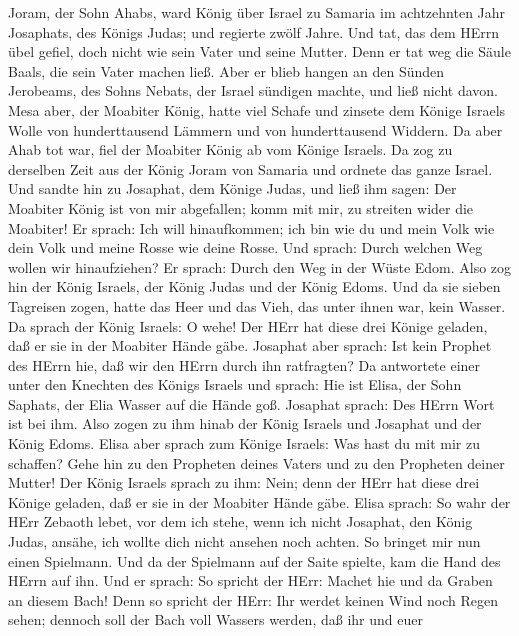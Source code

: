 Joram, der Sohn Ahabs, ward König über Israel zu Samaria im
achtzehnten Jahr Josaphats, des Königs Judas; und regierte zwölf Jahre.
 Und tat, das dem HErrn übel gefiel, doch nicht wie sein
Vater und seine Mutter. Denn er tat weg die Säule Baals, die sein Vater
machen ließ.  Aber er blieb hangen an den Sünden Jerobeams,
des Sohns Nebats, der Israel sündigen machte, und ließ nicht davon.
 Mesa aber, der Moabiter König, hatte viel Schafe und
zinsete dem Könige Israels Wolle von hunderttausend Lämmern und von
hunderttausend Widdern.  Da aber Ahab tot war, fiel der
Moabiter König ab vom Könige Israels.  Da zog zu derselben
Zeit aus der König Joram von Samaria und ordnete das ganze Israel.
 Und sandte hin zu Josaphat, dem Könige Judas, und ließ ihm
sagen: Der Moabiter König ist von mir abgefallen; komm mit mir, zu
streiten wider die Moabiter! Er sprach: Ich will hinaufkommen; ich bin
wie du und mein Volk wie dein Volk und meine Rosse wie deine Rosse.
 Und sprach: Durch welchen Weg wollen wir hinaufziehen? Er
sprach: Durch den Weg in der Wüste Edom.  Also zog hin der
König Israels, der König Judas und der König Edoms. Und da sie sieben
Tagreisen zogen, hatte das Heer und das Vieh, das unter ihnen war, kein
Wasser.  Da sprach der König Israels: O wehe! Der HErr hat
diese drei Könige geladen, daß er sie in der Moabiter Hände gäbe.
 Josaphat aber sprach: Ist kein Prophet des HErrn hie, daß
wir den HErrn durch ihn ratfragten? Da antwortete einer unter den
Knechten des Königs Israels und sprach: Hie ist Elisa, der Sohn Saphats,
der Elia Wasser auf die Hände goß.  Josaphat sprach: Des
HErrn Wort ist bei ihm. Also zogen zu ihm hinab der König Israels und
Josaphat und der König Edoms.  Elisa aber sprach zum Könige
Israels: Was hast du mit mir zu schaffen? Gehe hin zu den Propheten
deines Vaters und zu den Propheten deiner Mutter! Der König Israels
sprach zu ihm: Nein; denn der HErr hat diese drei Könige geladen, daß er
sie in der Moabiter Hände gäbe.  Elisa sprach: So wahr der
HErr Zebaoth lebet, vor dem ich stehe, wenn ich nicht Josaphat, den
König Judas, ansähe, ich wollte dich nicht ansehen noch achten.
 So bringet mir nun einen Spielmann. Und da der Spielmann
auf der Saite spielte, kam die Hand des HErrn auf ihn.  Und
er sprach: So spricht der HErr: Machet hie und da Graben an diesem Bach!
 Denn so spricht der HErr: Ihr werdet keinen Wind noch
Regen sehen; dennoch soll der Bach voll Wassers werden, daß ihr und euer

